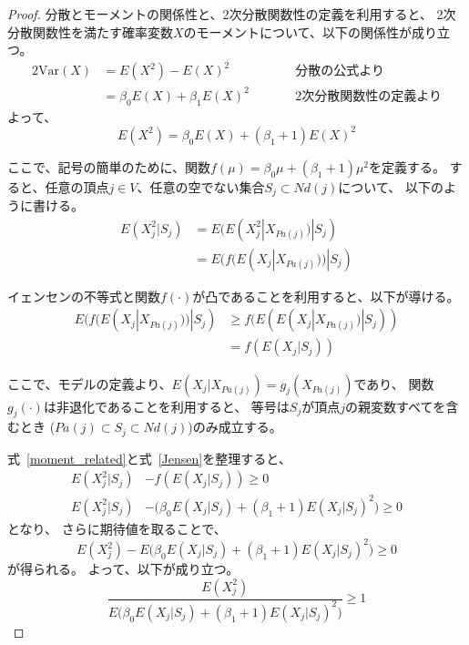 \begin{proof}
  分散とモーメントの関係性と、2次分散関数性の定義を利用すると、
  2次分散関数性を満たす確率変数$X$のモーメントについて、以下の関係性が成り立つ。
  \begin{alignat*}{2}
    \mathrm{Var}(X) &= E(X^2) - E(X)^2 & \qquad & \text{分散の公式より} \\
                    &= \beta_0 E(X) + \beta_1 E(X)^2 && \text{2次分散関数性の定義より}
  \end{alignat*}
  よって、
  \begin{equation*}
    E(X^2) = \beta_0 E(X) + (\beta_1 + 1) E(X)^2
  \end{equation*}

  ここで、記号の簡単のために、関数$f(\mu) = \beta_0 \mu + (\beta_1 + 1)\mu^2$を定義する。
  すると、任意の頂点$j \in V$、任意の空でない集合$S_j \subset \mathit{Nd}(j)$について、
  以下のように書ける。
  \begin{equation}
    \begin{split}
      E(X_j^2 | S_j) &= E(E(X_j^2 | X_{Pa(j)}) | S_j) \\
                     &= E(f(E(X_j | X_{Pa(j)})) | S_j)
      \label{moment_related}
    \end{split}
  \end{equation}

  イェンセンの不等式と関数$f(\cdot)$が凸であることを利用すると、以下が導ける。
  \begin{equation}
    \begin{split}
      E(f(E(X_j | X_{Pa(j)})) | S_j) & \geq
      f(E(E(X_j | X_{Pa(j)}) | S_j)) \\
      &= f(E(X_j | S_j))
      \label{Jensen}
    \end{split}
  \end{equation}

  ここで、モデルの定義より、$E(X_j | X_{Pa(j)}) = g_j(X_{Pa(j)})$であり、
  関数$g_j(\cdot)$は非退化であることを利用すると、
  等号は$S_j$が頂点$j$の親変数すべてを含むとき
  ($Pa(j) \subset S_j \subset \mathit{Nd}(j)$)のみ成立する。

  式~\eqref{moment_related}と式~\eqref{Jensen}を整理すると、
  \begin{equation*}
    \begin{split}
      E(X_j^2 | S_j) &- f(E(X_j | S_j)) \geq 0 \\
      E(X_j^2 | S_j) &- \bigl( \beta_0 E(X_j | S_j) +
      (\beta_1 + 1) E(X_j | S_j)^2 \bigl) \geq 0
    \end{split}
  \end{equation*}
  となり、
  さらに期待値を取ることで、
  \begin{equation}
    E(X_j^2) - E\bigl(\beta_0 E(X_j | S_j) + (\beta_1 + 1) E(X_j | S_j)^2 \bigl) \geq 0
    \label{proposition_1}
  \end{equation}
  が得られる。 よって、以下が成り立つ。
  \begin{equation}
    \frac{E(X_j^2)}
    {E\bigl( \beta_0 E(X_j | S_j) + (\beta_1 + 1) E(X_j | S_j)^2 \bigl)}
    \geq 1
    \label{proposition_2}
  \end{equation}


\end{proof}
